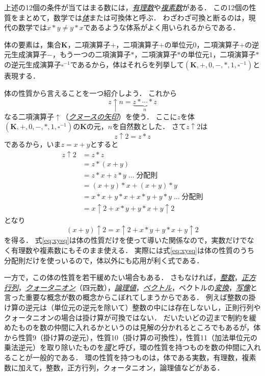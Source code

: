 \documentclass[twocolumn]{jsbook}
\newcommand{\keyword}[1]{\underline{\emph{#1}}}
\newcommand{\mathSomething}{\square}
\newcommand{\mathSet}[1]{\mathbf{#1}}
\newcommand{\mathField}[7]{(#1,#2,#3,#4,#5,#6,#7)}
\begin{document}
上述の12個の条件が当てはまる数には，\keyword{有理数}や\keyword{複素数}がある．
この12個の性質をまとめて，数学では\keyword{体}または可換体と呼ぶ．
わざわざ可換と断るのは，現代の数学では$x*y\neq y*x$であるような体系がよく用いられるからである．

体の要素は，集合$\mathSet{K}$，二項演算子$+$，二項演算子$+$の単位元$0$，二項演算子$+$の逆元生成演算子$-$，もう一つの二項演算子$*$，二項演算子$*$の単位元$1$，二項演算子$*$の逆元生成演算子$\mathSomething^{-1}$であるから，体はそれらを列挙して$\mathField{\mathSet{K}}{+}{0}{-}{*}{1}{\mathSomething^{-1}}$と表現する．

体の性質から言えることを一つ紹介しよう．
これから$$z\uparrow n=\underbrace{z*\dotsb*z}_n$$なる二項演算子$\uparrow$（\keyword{クヌースの矢印}）を使う．
ここに$z$を体$\mathField{\mathSet{K}}{+}{0}{-}{*}{1}{\mathSomething^{-1}}$の$\mathSet{K}$の元，$n$を自然数とした．
さて$z\uparrow2$は$$z\uparrow2=z*z$$であるから，いま$z=x+y$とすると
\begin{align*}
z\uparrow2&=z*z\\
&=z*(x+y)\\
&=z*x+z*y\;\dots\;\text{分配則}\\
&=(x+y)*x+(x+y)*y\\
&=x*x+y*x+x*y+y*y\;\dots\;\text{分配則}\\
&=x\uparrow2+x*y+y*x+y\uparrow2
\end{align*}
となり
\begin{equation}
\label{eq:xysq}
(x+y)\uparrow2=x\uparrow2+x*y+y*x+y\uparrow2
\end{equation}
を得る．
式\eqref{eq:xysq}は体の性質だけを使って導いた関係なので，実数だけでなく有理数や複素数にもそのまま使える．
実際には式\eqref{eq:xysq}は体の性質のうち分配則だけを使っいるので，体以外にも応用が利く式である．

一方で，この体の性質を若干緩めたい場合もある．
さもなければ，\keyword{整数}，\keyword{正方行列}，\keyword{クォータニオン}（四元数），\keyword{論理値}，\keyword{ベクトル}，ベクトルの\keyword{変換}，\keyword{写像}と言った重要な概念が数の概念からこぼれてしまうからである．
例えば整数の掛け算の逆元は（単位元の逆元を除いて）整数の中には存在しないし，正則行列やクォータニオンの場合は掛け算が可換ではない．
だいたいどの辺まで制約を緩めたものを数の仲間に入れるかというのは見解の分かれるところでもあるが，体から性質9（掛け算の逆元），性質10（掛け算の可換性），性質11（加法単位元の乗法逆元）を取り除いたものを\keyword{環}と呼び，環の性質を持つものを数の仲間に入れることが一般的である．
環の性質を持つものは，体である実数，有理数，複素数に加えて，整数，正方行列，クォータニオン，論理値などがある．
\end{document}
